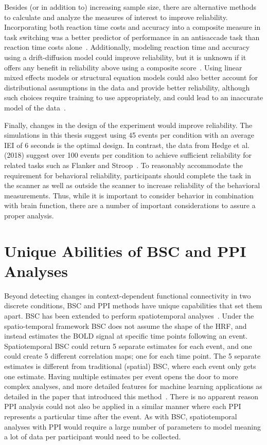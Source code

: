 \documentclass[phd,figures,tables,ackpage,abstractpage,publicabstractpage]{uithesis}
\begin{document}
Besides (or in addition to) increasing sample size, there are alternative methods to
calculate and analyze the measures of interest to improve reliability.
Incorporating both reaction time costs and accuracy into a composite measure in task switching was
a better predictor of performance in an antisaccade task than reaction time costs alone~\cite{Hughes2014}.
Additionally, modeling reaction time and accuracy using a drift-diffusion model could improve 
reliability, but it is unknown if it offers any benefit in
reliability above using a composite score~\cite{Schmitz2012,Ratcliff1978,Lerche2017}.
Using linear mixed effects models or structural equation models could also better account
for distributional assumptions in the data and provide better reliability, although
such choices require training to use appropriately, and could lead to an inaccurate
model of the data~\cite{West2008,Bates2015}.

Finally, changes in the design of the experiment would improve reliability.
The simulations in this thesis suggest using 45 events per condition
with an average IEI of 6 seconds is the optimal design.
In contrast, the data from Hedge et al. (2018) suggest over 100 events per condition
to achieve sufficient reliability for related tasks such as Flanker and
Stroop~\cite{Hedge2018}.
To reasonably accommodate the requirement for behavioral reliability,
participants should complete the task in the scanner as well as outside
the scanner to increase reliability of the behavioral measurements.
Thus, while it is important to consider behavior in combination with brain function,
there are a number of important considerations to assure a proper analysis.

\section{Unique Abilities of BSC and PPI Analyses}

Beyond detecting changes in context-dependent functional connectivity in two discrete
conditions, BSC and PPI methods have unique capabilities that set them apart.
BSC has been extended to perform spatiotemporal analyses~\cite{Turner2012a}.
Under the spatio-temporal framework BSC does not assume the shape of the HRF,
and instead estimates the BOLD signal at specific time points following an event.
Spatiotemporal BSC could return 5 separate estimates for each event, and
one could create 5 different correlation maps; one for each time point.
The 5 separate estimates is different from traditional (spatial) BSC,
where each event only gets one estimate.
Having multiple estimates per event opens the door to more complex analyses,
and more detailed features for machine learning applications as detailed in
the paper that introduced this method~\cite{Turner2012a}.
There is no apparent reason PPI analysis could not also be applied in a similar manner
where each PPI represents a particular time after the event.
As with BSC, spatiotemporal analyses with PPI would require a large number
of parameters to model meaning a lot of data per participant would need to be
collected.
\end{document}

